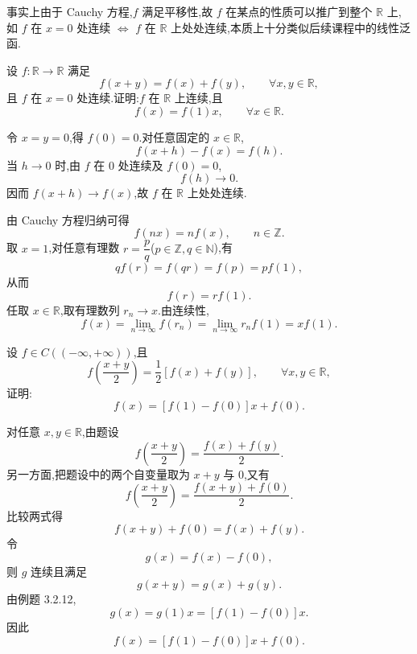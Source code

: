\begin{remark}
    事实上由于 Cauchy 方程,$f$ 满足平移性,故 $f$ 在某点的性质可以推广到整个 $\mathbb{R}$ 上,如 $f$ 在 $x=0$ 处连续 $\Longleftrightarrow$ $f$ 在 $\mathbb{R}$ 上处处连续,本质上十分类似后续课程中的线性泛函.
\end{remark}

\begin{example}
    设 $f:\mathbb{R}\to\mathbb{R}$ 满足
    \[
        f(x+y)=f(x)+f(y),\qquad \forall x,y\in\mathbb{R},
    \]
    且 $f$ 在 $x=0$ 处连续.证明:$f$ 在 $\mathbb{R}$ 上连续,且
    \[
        f(x)=f(1)x,\qquad \forall x\in\mathbb{R}.
    \]
\end{example}
\exampleblank

\begin{solution}
    令 $x=y=0$,得 $f(0)=0$.对任意固定的 $x\in\mathbb{R}$,
    \[
        f(x+h)-f(x)=f(h).
    \]
    当 $h\to0$ 时,由 $f$ 在 $0$ 处连续及 $f(0)=0$,
    \[
        f(h)\to0.
    \]
    因而 $f(x+h)\to f(x)$,故 $f$ 在 $\mathbb{R}$ 上处处连续.

    由 Cauchy 方程归纳可得
    \[
        f(nx)=nf(x),\qquad n\in\mathbb{Z}.
    \]
    取 $x=1$,对任意有理数 $r=\dfrac{p}{q}$($p\in\mathbb{Z},q\in\mathbb{N}$),有
    \[
        qf(r)=f(qr)=f(p)=pf(1),
    \]
    从而
    \[
        f(r)=rf(1).
    \]
    任取 $x\in\mathbb{R}$,取有理数列 $r_n\to x$.由连续性,
    \[
        f(x)=\lim\limits_{n\to\infty}f(r_n)
        =\lim\limits_{n\to\infty}r_nf(1)
        =xf(1).
    \]
\end{solution}

\begin{example}
    设 $f\in C((-\infty,+\infty))$,且
    \[
        f\left(\dfrac{x+y}{2}\right)=\dfrac{1}{2}[f(x)+f(y)],\qquad \forall x,y\in\mathbb{R},
    \]
    证明:
    \[
        f(x)=[f(1)-f(0)]x+f(0).
    \]
\end{example}
\exampleblank

\begin{solution}
    对任意 $x,y\in\mathbb{R}$,由题设
    \[
        f\left(\dfrac{x+y}{2}\right)=\dfrac{f(x)+f(y)}{2}.
    \]
    另一方面,把题设中的两个自变量取为 $x+y$ 与 $0$,又有
    \[
        f\left(\dfrac{x+y}{2}\right)=\dfrac{f(x+y)+f(0)}{2}.
    \]
    比较两式得
    \[
        f(x+y)+f(0)=f(x)+f(y).
    \]
    令
    \[
        g(x)=f(x)-f(0),
    \]
    则 $g$ 连续且满足
    \[
        g(x+y)=g(x)+g(y).
    \]
    由例题 3.2.12,
    \[
        g(x)=g(1)x=[f(1)-f(0)]x.
    \]
    因此
    \[
        f(x)=[f(1)-f(0)]x+f(0).
    \]
\end{solution}

